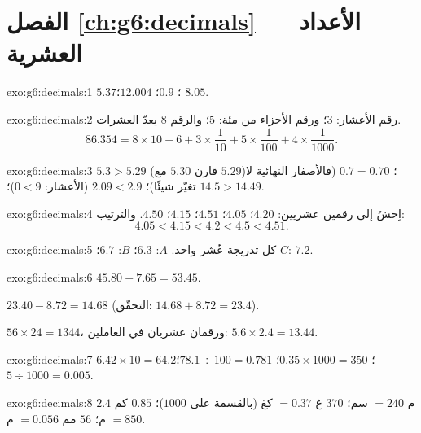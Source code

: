 \section*{الفصل \ref{ch:g6:decimals} --- الأعداد العشرية}

\begin{solution}{exo:g6:decimals:1}
$5.37$؛ \quad $0.9$؛ \quad $12.004$؛ \quad $8.05$.
\end{solution}

\begin{solution}{exo:g6:decimals:2}
رقم الأعشار: $3$؛ ورقم الأجزاء من مئة: $5$؛ والرقم $8$ يعدّ العشرات.
\[
86.354 = 8 \times 10 + 6 + 3 \times \frac{1}{10} + 5 \times
\frac{1}{100} + 4 \times \frac{1}{1000}.
\]
\end{solution}

\begin{solution}{exo:g6:decimals:3}
$5.3 > 5.29$ (قارن $5.30$ مع $5.29$)؛ \quad
$0.7 = 0.70$ (فالأصفار النهائية لا تغيّر شيئًا)؛ \quad
$2.09 < 2.9$ (الأعشار: $0 < 9$)؛ \quad
$14.5 > 14.49$.
\end{solution}

\begin{solution}{exo:g6:decimals:4}
اِحشُ إلى رقمين عشريين: $4.20$؛ $4.05$؛ $4.51$؛ $4.15$؛ $4.50$. والترتيب:
\[
4.05 < 4.15 < 4.2 < 4.5 < 4.51 .
\]
\end{solution}

\begin{solution}{exo:g6:decimals:5}
كل تدريجة عُشر واحد. $A$: $6.3$؛ \quad $B$: $6.7$؛ \quad
$C$: $7.2$.
\end{solution}

\begin{solution}{exo:g6:decimals:6}
$45.80 + 7.65 = 53.45$.

$23.40 - 8.72 = 14.68$ (التحقّق: $14.68 + 8.72 = 23.4$).

$56 \times 24 = 1344$، ورقمان عشريان في العاملين:
$5.6 \times 2.4 = 13.44$.
\end{solution}

\begin{solution}{exo:g6:decimals:7}
$6.42 \times 10 = 64.2$؛ \quad
$0.35 \times 1000 = 350$؛ \quad
$78.1 \div 100 = 0.781$؛ \quad
$5 \div 1000 = 0.005$.
\end{solution}

\begin{solution}{exo:g6:decimals:8}
$2.4$ م $= 240$ سم؛ \quad $370$ غ $= 0.37$ كغ (بالقسمة على $1000$)؛
\quad $0.85$ كم $= 850$ م؛ \quad $56$ مم $= 0.056$ م.
\end{solution}

